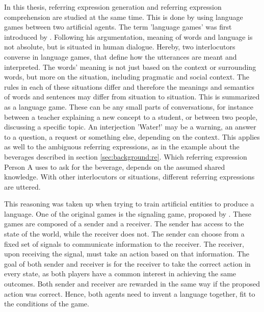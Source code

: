 In this thesis, referring expression generation and referring expression comprehension are studied at the same time.
This is done by using language games between two artificial agents.
The term 'language games' was first introduced by \citet{Wittgenstein1953}.
Following his argumentation, meaning of words and language is not absolute, but is situated in human dialogue.
Hereby, two interlocutors converse in language games, that define how the utterances are meant and interpreted.
The words' meaning is not just based on the context or surrounding words, but more on the situation, including pragmatic and social context.
The rules in each of these situations differ and therefore the meanings and semantics of words and sentences may differ from situation to situation.
This is summarized as a language game.
These can be any small parts of conversations, for instance between a teacher explaining a new concept to a student, or between two people, discussing a specific topic.
An interjection 'Water!' may be a warning, an answer to a question, a request or something else, depending on the context.
This applies as well to the ambiguous referring expressions, as in the example about the beverages described in section \ref{sec:background:re}.
Which referring expression Person A uses to ask for the beverage, depends on the assumed shared knowledge.
With other interlocutors or situations, different referring expressions are uttered.

This reasoning was taken up when trying to train artificial entities to produce a language.
One of the original games is the signaling game, proposed by \citet{Lewis1969}.
These games are composed of a sender and a receiver.
The sender has access to the state of the world, while the receiver does not.
The sender can choose from a fixed set of signals to communicate information to the receiver.
The receiver, upon receiving the signal, must take an action based on that information.
The goal of both sender and receiver is for the receiver to take the correct action in every state, as both players have a common interest in achieving the same outcomes.
Both sender and receiver are rewarded in the same way if the proposed action was correct.
Hence, both agents need to invent a language together, fit to the conditions of the game.

